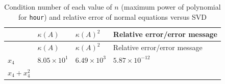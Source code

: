 \documentclass[
]{article}
\begin{document}
\begin{longtable}[]{@{}llll@{}}
\caption{Condition number of each value of \(n\) (maximum power of
polynomial for \texttt{hour}) and relative error of normal equations
versus SVD}\tabularnewline
\toprule
\begin{minipage}[b]{0.23\columnwidth}\raggedright
\strut
\end{minipage} & \begin{minipage}[b]{0.15\columnwidth}\raggedright
\(\kappa(A)\)\strut
\end{minipage} & \begin{minipage}[b]{0.15\columnwidth}\raggedright
\(\kappa(A)^{2}\)\strut
\end{minipage} & \begin{minipage}[b]{0.36\columnwidth}\raggedright
Relative error/error message\strut
\end{minipage}\tabularnewline
\midrule
\endfirsthead
\toprule
\begin{minipage}[b]{0.23\columnwidth}\raggedright
\strut
\end{minipage} & \begin{minipage}[b]{0.15\columnwidth}\raggedright
\(\kappa(A)\)\strut
\end{minipage} & \begin{minipage}[b]{0.15\columnwidth}\raggedright
\(\kappa(A)^{2}\)\strut
\end{minipage} & \begin{minipage}[b]{0.36\columnwidth}\raggedright
Relative error/error message\strut
\end{minipage}\tabularnewline
\midrule
\endhead
\begin{minipage}[t]{0.23\columnwidth}\raggedright
\(x_{4}\)\strut
\end{minipage} & \begin{minipage}[t]{0.15\columnwidth}\raggedright
\(8.05 \times 10^{1}\)\strut
\end{minipage} & \begin{minipage}[t]{0.15\columnwidth}\raggedright
\(6.49 \times 10^{3}\)\strut
\end{minipage} & \begin{minipage}[t]{0.36\columnwidth}\raggedright
\(5.87 \times 10^{-12}\)\strut
\end{minipage}\tabularnewline
\begin{minipage}[t]{0.23\columnwidth}\raggedright
\(x_{4}+x_{4}^{2}\)\strut
\end{minipage} & \begin{minipage}[t]{0.15\columnwidth}\raggedright

\end{minipage}
\end{longtable}
\end{document}
